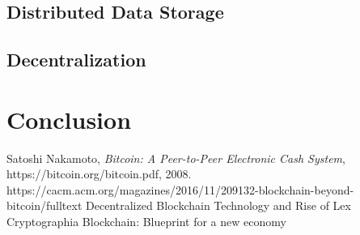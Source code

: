 \documentclass[report]{IEEEtran}
\begin{document}
\subsection{Distributed Data Storage}
\subsection{Decentralization}
\section{Conclusion}

\begin{thebibliography}{1}

Satoshi Nakamoto, \emph{Bitcoin: A Peer-to-Peer Electronic Cash System}, https://bitcoin.org/bitcoin.pdf, 2008.
https://cacm.acm.org/magazines/2016/11/209132-blockchain-beyond-bitcoin/fulltext
\bibitem{}
Decentralized Blockchain Technology and Rise of Lex Cryptographia
\bibitem{}
Blockchain: Blueprint for a new economy
\end{thebibliography}
\end{document}
